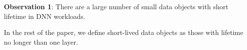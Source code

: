 \textbf{Observation 1}: There are a large number of small data objects with short lifetime in DNN workloads.

In the rest of the paper, we define short-lived data objects as those with lifetime no longer than one layer.

